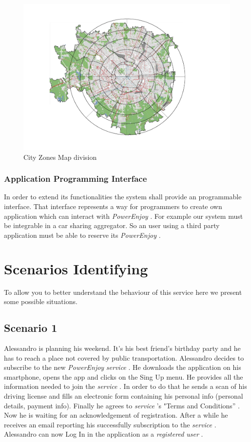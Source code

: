 \documentclass[english]{article}
\newcommand{\powerenjoy}{\textit{PowerEnjoy }}
\newcommand{\registereduser}{\textit {registered user }}
\newcommand{\service}{\textit{service }}
\begin{document}
		\noindent
		\begin{figure}[H]
\centering
\includegraphics[scale=0.4]{mappazone.pdf}%

\caption{City Zones Map division}
\end{figure}
		

		

		\subsubsection{Application Programming Interface}
		In order to extend its functionalities the system shall provide an programmable interface. That interface represents a way for programmers to create own application which can interact with \powerenjoy. For example our system must be integrable in a car sharing aggregator. So an user using a third party application must be able to reserve its \powerenjoy.
		

\section{Scenarios Identifying}
	To allow you to better understand the behaviour of this service here we present some possible situations.
	\subsection{Scenario 1}
		Alessandro is planning his weekend. It's his best friend's birthday party and he has to reach a place not covered by public transportation. Alessandro decides to subscribe to the new \powerenjoy \service. He downloads the application on his smartphone, opens the app and clicks on the Sing Up menu. He provides all the information needed to join the \service. In order to do that he sends a scan of his driving license and fills an electronic form containing his personal info (personal details, payment info). Finally he agrees to \service's	"Terms and Conditions'' .
		Now he is waiting for an acknowledgement of registration. After a while he receives an email reporting his successfully subscription to the \service. Alessandro can now Log In in the application as a \registereduser.
\end{document}
